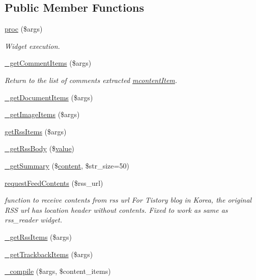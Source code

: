 \subsection*{Public Member Functions}
\begin{DoxyCompactItemize}
\item 
\hyperlink{classmcontent_abdf3692374f645c0a808db2225b9fec3}{proc} (\$args)
\begin{DoxyCompactList}\small\item\em Widget execution. \end{DoxyCompactList}\item 
\hyperlink{classmcontent_a6a077425294207e1e357668b82e30bbf}{\+\_\+get\+Comment\+Items} (\$args)
\begin{DoxyCompactList}\small\item\em Return to the list of comments extracted \hyperlink{classmcontentItem}{mcontent\+Item}. \end{DoxyCompactList}\item 
\hyperlink{classmcontent_a6a6b96bd0a1ce21aab3a350c1584554a}{\+\_\+get\+Document\+Items} (\$args)
\item 
\hyperlink{classmcontent_ac6b1900f46d6b9cbc1c1513a90a63811}{\+\_\+get\+Image\+Items} (\$args)
\item 
\hyperlink{classmcontent_a4b6b633f77c7f2280e1a0fde292b8a62}{get\+Rss\+Items} (\$args)
\item 
\hyperlink{classmcontent_a5d41447024e60278f0cf46cea902da52}{\+\_\+get\+Rss\+Body} (\$\hyperlink{jquery_8js_abe5393d870043cf6aaa1d5ad5fce755c}{value})
\item 
\hyperlink{classmcontent_a4b4f237f52d20441108cadc2ffe0d43c}{\+\_\+get\+Summary} (\$\hyperlink{classcontent}{content}, \$str\+\_\+size=50)
\item 
\hyperlink{classmcontent_a9c74009a166bfac6a467cb27bc2ad214}{request\+Feed\+Contents} (\$rss\+\_\+url)
\begin{DoxyCompactList}\small\item\em function to receive contents from rss url For Tistory blog in Korea, the original R\+SS url has location header without contents. Fixed to work as same as rss\+\_\+reader widget. \end{DoxyCompactList}\item 
\hyperlink{classmcontent_a0fe2153c16b911c8dc3fe1184a72d378}{\+\_\+get\+Rss\+Items} (\$args)
\item 
\hyperlink{classmcontent_a8ef730735e4af7716442ae3c5d1b749a}{\+\_\+get\+Trackback\+Items} (\$args)
\item 
\hyperlink{classmcontent_ad31110bd1251e8de6256b26c279f32c9}{\+\_\+compile} (\$args, \$content\+\_\+items)
\end{DoxyCompactItemize}
